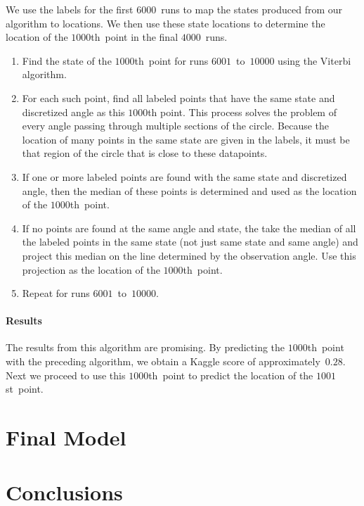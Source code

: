 \documentclass[twoside]{article}
\begin{document}
We use the labels for the first $\num{6000}$~runs to map the states produced from our algorithm to locations.
We then use these state locations to determine the location of the $\num{1000}$th~point in the final $\num{4000}$~runs.
\begin{enumerate}
\item Find the state of the $\num{1000}$th~point for runs $\num{6001}$~to~$\num{10000}$ using the Viterbi algorithm.
\item For each such point, find all labeled points that have the same state and discretized angle as this $\num{1000}$th point.
  This process solves the problem of every angle passing through multiple sections of the circle.
  Because the location of many points in the same state are given in the labels, it must be that region of the circle that is close to these datapoints.
\item If one or more labeled points are found with the same state and discretized angle, then the median of these points is determined and used as the location of the $\num{1000}$th~point.
\item If no points are found at the same angle and state, the take the median of all the labeled points in the same state (not just same state and same angle) and project this median on the line determined by the observation angle.
  Use this projection as the location of the $\num{1000}$th~point.
\item Repeat for runs $\num{6001}$~to~$\num{10000}$.
\end{enumerate}

\paragraph{Results}

The results from this algorithm are promising.
By predicting the $\num{1000}$th~point with the preceding algorithm, we obtain a Kaggle score of approximately~$0.28$.
Next we proceed to use this $\num{1000}$th~point to predict the location of the $\num{1001}$st~point.

\section{Final Model}\label{sec:final-model}

\section{Conclusions}\label{sec:conclusions}
\end{document}
